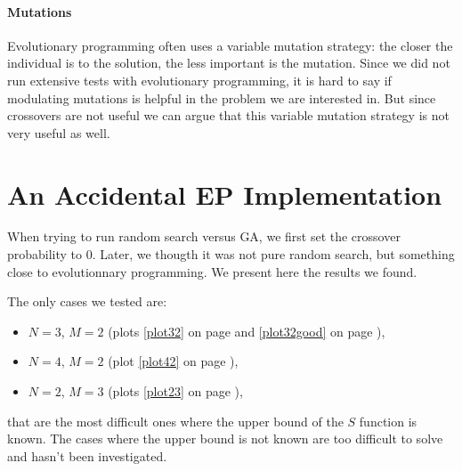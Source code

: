 \documentclass{report}
\begin{document}
\paragraph{Mutations}
Evolutionary programming often uses a variable mutation strategy: the closer the individual is to the solution, the less important is the mutation. Since we did not run extensive tests with evolutionary programming, it is hard to say if modulating mutations is helpful in the problem we are interested in. But since crossovers are not useful we can argue that this variable mutation strategy is not very useful as well. 


\section*{An Accidental EP Implementation}

When trying to run random search versus GA, we first set the crossover probability to 0. Later, we thougth it was not pure random search, but something close to evolutionnary programming. We present here the results we found.

The only cases we tested are:
\begin{itemize}
\item $N = 3$, $M = 2$ (plots \ref{plot32} on page \pageref{plot32} and \ref{plot32good} on page \pageref{plot32good}),
\item $N = 4$, $M = 2$ (plot \ref{plot42} on page \pageref{plot42}),
\item $N = 2$, $M = 3$ (plots \ref{plot23} on page \pageref{plot23}),
\end{itemize}

that are the most difficult ones where the upper bound of the $S$ function is known. The cases where the upper bound is not known are too difficult to solve and hasn't been investigated.
\end{document}
